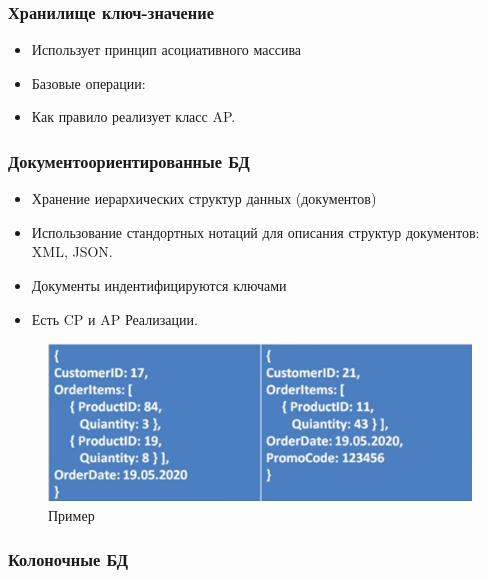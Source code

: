 \documentclass{article}
\begin{document}
\subsubsection{Хранилище ключ-значение}
\begin{itemize}
    \item Использует принцип асоциативного массива
    \item Базовые операции:
    \item Как правило реализует класс AP.
\end{itemize}

\newpage

\subsubsection{Документоориентированные БД}

\begin{itemize}
    \item Хранение иерархических структур данных (документов)
    \item Использование стандортных нотаций для описания структур документов: XML, JSON.
    \item Документы индентифицируются ключами
    \item Есть CP и AP Реализации.
\end{itemize}

\begin{figure}[H]
    \centering
    \includegraphics[width = .7\linewidth]{img0}
    \caption{Пример}
\end{figure}
 
 \subsubsection{Колоночные БД}
\end{document}
